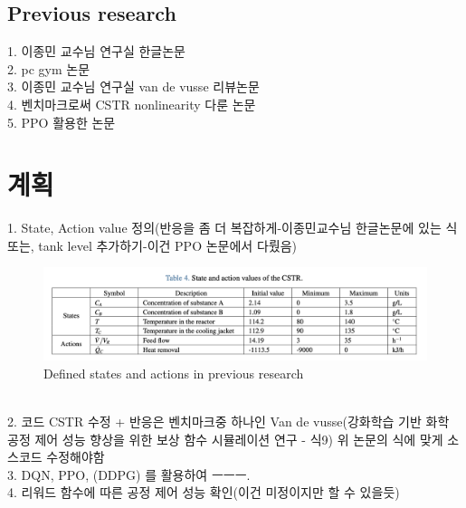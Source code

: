 \documentclass[11pt]{article}
\begin{document}
\subsection{Previous research}
1. 이종민 교수님 연구실 한글논문 \cite{Park2024rl}\\
2. pc gym 논문 \cite{bloor2024pcgym}\\
3. 이종민 교수님 연구실 van de vusse 리뷰논문 \cite{Park2025pc} \\
4. 벤치마크로써 CSTR nonlinearity 다룬 논문 \cite{chen1995benchmark} \\
5. PPO 활용한 논문 \cite{Yu2025ppo}

\section{계획}
1. State, Action value 정의(반응을 좀 더 복잡하게-이종민교수님 한글논문에 있는 식 또는, tank level 추가하기-이건 PPO 논문에서 다뤘음)\\
\begin{figure}[h!]
    \centering
    \includegraphics[width=\textwidth]{ref_table1.png} %
    \caption{Defined states and actions in previous research}
    \label{fig1}
\end{figure}
\\
2. 코드 CSTR 수정 
+ 반응은 벤치마크중 하나인 Van de vusse(강화학습 기반 화학 공정 제어 성능 향상을 위한 보상 함수 시뮬레이션 연구 - 식9)
위 논문의 식에 맞게 소스코드 수정해야함\\
3. DQN, PPO, (DDPG) 를 활용하여 ㅡㅡㅡ. \\
4. 리워드 함수에 따른 공정 제어 성능 확인(이건 미정이지만 할 수 있을듯)\\



\end{document}

